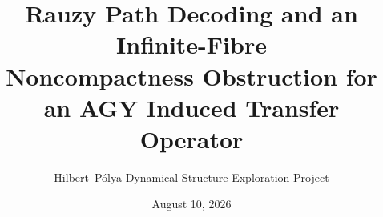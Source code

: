 \documentclass[11pt]{article}
\title{Rauzy Path Decoding and an Infinite-Fibre\\
Noncompactness Obstruction for an AGY Induced Transfer Operator}
\author{Hilbert--P\'olya Dynamical Structure Exploration Project}
\date{August 10, 2026}
\theoremstyle{definition}
\theoremstyle{remark}
\begin{document}
\maketitle

\begin{abstract}

\end{abstract}












\appendix

\end{document}
